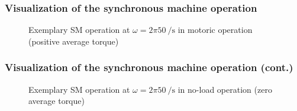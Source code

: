 \begin{frame}
	\frametitle{Visualization of the synchronous machine operation}
    \vspace{-0.275cm}
    \begin{figure}
        \centering
        \vspace{-0.25cm}
        \caption{Exemplary SM operation at $\omega=2 \pi \SI{50}{\per\second}$ in motoric operation (positive average torque)}
        \label{fig:SM_load_angle_90_animation}
    \end{figure}
\end{frame}

\begin{frame}
	\frametitle{Visualization of the synchronous machine operation (cont.)}
    \vspace{-0.275cm}
    \begin{figure}
        \centering
        \vspace{-0.25cm}
        \caption{Exemplary SM operation at $\omega=2 \pi \SI{50}{\per\second}$ in no-load operation (zero average torque)}
        \label{fig:SM_load_angle_0_animation}
    \end{figure}
\end{frame}

